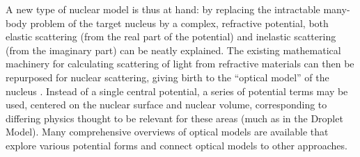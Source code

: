 A new type of nuclear model is thus at hand:
by replacing the intractable many-body problem
of the target nucleus by a complex, refractive potential, both elastic scattering (from the real 
part of the potential) and inelastic scattering (from the imaginary part) can be neatly 
explained. The existing mathematical machinery for calculating scattering of light from
refractive materials can then be repurposed for nuclear scattering, giving birth to
the ``optical model'' of the nucleus \cite{Feshbach1958, McVoy1967}.
Instead of a single central potential, a series
of potential terms may be used,
centered on the nuclear surface and nuclear volume,
corresponding to differing physics thought to be relevant for these areas (much
as in the Droplet Model). Many comprehensive overviews of optical models are
available \cite{Dickhoff2018, Hodgson1971} that explore various potential forms
and connect optical models to other approaches.

